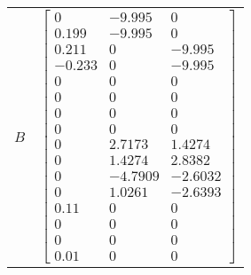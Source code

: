 \begin{tabular}{cl}
   $B$    & $\left[\begin{matrix}0 & -9.995 & 0\\0.199 & -9.995 & 0\\0.211 & 0 & -9.995\\-0.233 & 0 & -9.995\\0 & 0 & 0\\0 & 0 & 0\\0 & 0 & 0\\0 & 0 & 0\\0 & 2.7173 & 1.4274\\0 & 1.4274 & 2.8382\\0 & -4.7909 & -2.6032\\0 & 1.0261 & -2.6393\\0.11 & 0 & 0\\0 & 0 & 0\\0 & 0 & 0\\0.01 & 0 & 0\end{matrix}\right]$                                                                                                                                                                                                                                                                                                                                                                                                                                                                                                                                                                                                                                                                                                                                                                                                                                                                                                                                                                                                   \\

\end{tabular}
